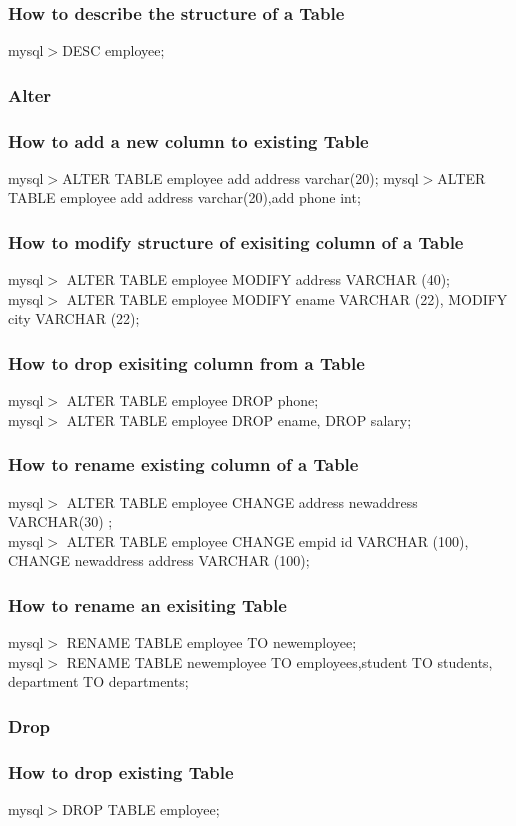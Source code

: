 \documentclass[11pt,a4paper]{article}
\begin{document}
\subsubsection*{How to describe the structure of a Table}
mysql$>$DESC employee;
\subsubsection*{Alter}
\subsubsection*{How to add a new column to existing Table}
mysql$>$ALTER TABLE employee add address varchar(20);\newline
mysql$>$ALTER TABLE employee add address varchar(20),add phone int; 
\subsubsection*{How to modify structure of exisiting column of a Table}
mysql$>$ ALTER TABLE employee MODIFY address VARCHAR (40);\\
mysql$>$ ALTER TABLE employee MODIFY ename VARCHAR (22), MODIFY city VARCHAR (22);
\subsubsection*{How to drop exisiting column from a Table}
mysql$>$ ALTER TABLE employee DROP phone;\\
mysql$>$ ALTER TABLE employee DROP ename, DROP salary;
\subsubsection*{How to rename existing column of a Table}
mysql$>$ ALTER TABLE employee CHANGE address newaddress VARCHAR(30) ;\\
mysql$>$ ALTER TABLE employee CHANGE empid id VARCHAR (100), CHANGE newaddress address VARCHAR (100);
\subsubsection*{How to rename an exisiting Table}
mysql$>$ RENAME TABLE employee TO newemployee;\\
mysql$>$ RENAME TABLE newemployee TO employees,student TO students, department TO departments;
\subsubsection*{Drop}
\subsubsection*{How to drop existing Table}
mysql$>$DROP TABLE employee;
\end{document}
